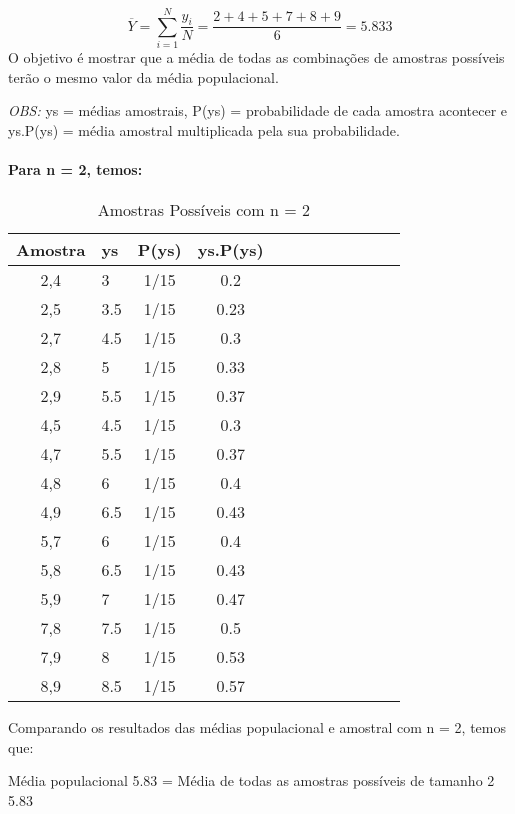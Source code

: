 \documentclass[]{article}
\let\oldparagraph\paragraph
\renewcommand{\paragraph}[1]{\oldparagraph{#1}\mbox{}}
\begin{document}
\[
\overline{Y} = \sum_{i=1}^N\dfrac{y_i}{N} = \dfrac{2+4+5+7+8+9}{6} = 5.833
\] O objetivo é mostrar que a média de todas as combinações de amostras
possíveis terão o mesmo valor da média populacional.

\emph{OBS:} ys = médias amostrais, P(ys) = probabilidade de cada amostra
acontecer e ys.P(ys) = média amostral multiplicada pela sua
probabilidade.

\newpage

\paragraph{Para n = 2, temos:}\label{para-n-2-temos}

\begin{table}

\caption{\label{tab:unnamed-chunk-1}Amostras Possíveis com n = 2}
\centering
\begin{tabular}[t]{clc|clc|clc|clc}
\hline
Amostra & ys & P(ys) & ys.P(ys)\\
\hline
2,4 & 3 & 1/15 & 0.2\\
\hline
2,5 & 3.5 & 1/15 & 0.23\\
\hline
2,7 & 4.5 & 1/15 & 0.3\\
\hline
2,8 & 5 & 1/15 & 0.33\\
\hline
2,9 & 5.5 & 1/15 & 0.37\\
\hline
4,5 & 4.5 & 1/15 & 0.3\\
\hline
4,7 & 5.5 & 1/15 & 0.37\\
\hline
4,8 & 6 & 1/15 & 0.4\\
\hline
4,9 & 6.5 & 1/15 & 0.43\\
\hline
5,7 & 6 & 1/15 & 0.4\\
\hline
5,8 & 6.5 & 1/15 & 0.43\\
\hline
5,9 & 7 & 1/15 & 0.47\\
\hline
7,8 & 7.5 & 1/15 & 0.5\\
\hline
7,9 & 8 & 1/15 & 0.53\\
\hline
8,9 & 8.5 & 1/15 & 0.57\\
\hline
\end{tabular}
\end{table}

Comparando os resultados das médias populacional e amostral com n = 2,
temos que:

Média populacional 5.83 = Média de todas as amostras possíveis de
tamanho 2 5.83
\end{document}

